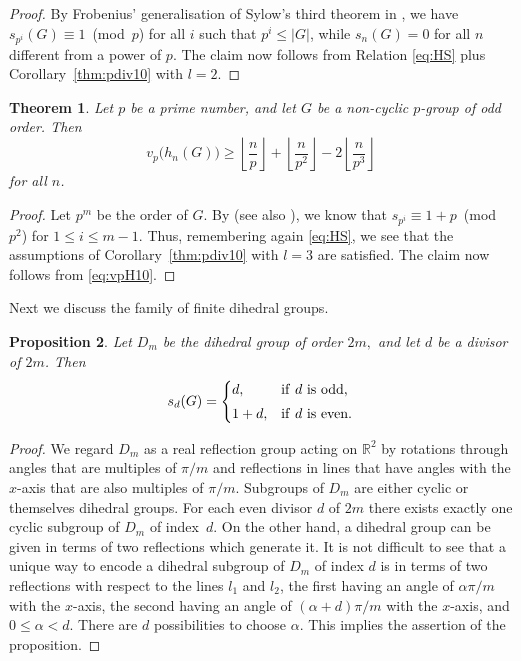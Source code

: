 \documentclass[12pt,reqno]{amsart}
\numberwithin{equation}{section}
\newtheorem{theorem}{Theorem}
\newtheorem{proposition}[theorem]{Proposition}
\theoremstyle{remark}
\begin{document}
\begin{proof}
By Frobenius' generalisation of Sylow's third theorem in \cite{Frob1},  
we have $s_{p^i}(G)\equiv1$~(mod~$p$) for all $i$ such that
$p^i\le \vert G\vert$, while $s_n(G)=0$ for all $n$ different
from a power of $p$. The claim now
follows from Relation \eqref{eq:HS} plus
Corollary~\ref{thm:pdiv10} with $l=2$.
\end{proof}

\begin{theorem} \label{thm:Kul}
Let $p$ be a prime number, and
let $G$ be a non-cyclic $p$-group of odd order.
Then
\begin{equation} \label{eq:vpKul}
v_p\big(h_n(G)\big)\ge
{\left\lfloor{\frac {n} {p}}\right\rfloor}
+{\left\lfloor{\frac {n} {p^2}}\right\rfloor}
-2{\left\lfloor{\frac {n} {p^3}}\right\rfloor}
\end{equation}
for all $n$.
\end{theorem}

\begin{proof}
Let $p^m$ be the order of $G$.
By \cite{KulaAA} (see also \cite[Theorem~1.52]{HallAA}),
we know that $s_{p^i}\equiv 1+p$~(mod~$p^2$) for $1\le i\le m-1$.
Thus, remembering again \eqref{eq:HS}, we see that the assumptions
of Corollary~\ref{thm:pdiv10} with $l=3$ are satisfied.
The claim now follows from \eqref{eq:vpH10}.
\end{proof}

Next we discuss the family of finite dihedral groups.

\begin{proposition}
\label{Prop:FiniteDihedral}
Let $D_m$
be the dihedral group of order $2m,$ and let $d$ be a divisor of
$2m$. Then
\[
s_{d}(G) = \begin{cases} d,& \text{if\/ $d$ is odd,}\\[1mm]
1+d,& \text{if\/ $d$ is even}.\end{cases}
\]
\end{proposition}

\begin{proof}
We regard $D_m$ as a real reflection group acting on $\mathbb R^2$
by rotations through angles that are multiples of $\pi/m$ 
and reflections in lines that have angles with the $x$-axis that
are also multiples of $\pi/m$. 
Subgroups of $D_m$ are either cyclic or themselves dihedral groups.
For each even divisor $d$ of $2m$ there exists exactly one cyclic
subgroup of $D_m$ of index~$d$. On the other hand, a dihedral group
can be given in terms of two reflections which generate it.
It is not difficult to see that a unique way to encode a dihedral
subgroup of $D_m$ of index $d$ is in terms of two reflections with respect to
the lines $l_1$ and $l_2$, the first having an angle of ${\alpha}\pi/m$
with the $x$-axis, the second having an angle of $({\alpha}+d)\pi/m$ with
the $x$-axis, and $0\le {\alpha}<d$. There are $d$ possibilities to choose
${\alpha}$. This implies the assertion of the proposition.
\end{proof}
\end{document}
